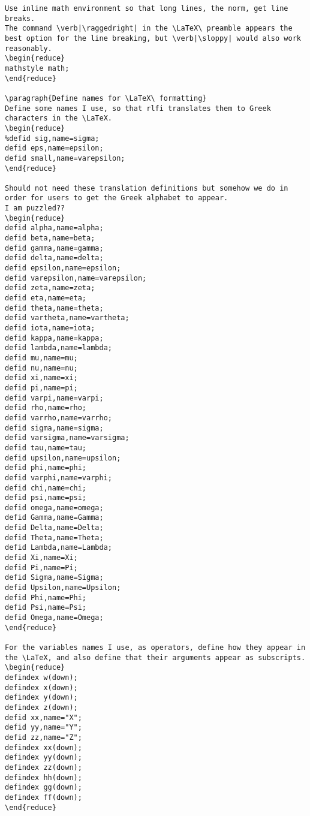 \documentclass[11pt,a5paper]{article}
\begin{document}
\begin{reduce}
\begin{verbatim}
Use inline math environment so that long lines, the norm, get line breaks.
The command \verb|\raggedright| in the \LaTeX\ preamble appears the best option for the line breaking, but \verb|\sloppy| would also work reasonably.
\begin{reduce}
mathstyle math;
\end{reduce}

\paragraph{Define names for \LaTeX\ formatting}
Define some names I use, so that rlfi translates them to Greek characters in the \LaTeX.
\begin{reduce}
%defid sig,name=sigma;
defid eps,name=epsilon;
defid small,name=varepsilon;
\end{reduce}

Should not need these translation definitions but somehow we do in order for users to get the Greek alphabet to appear.
I am puzzled??
\begin{reduce}
defid alpha,name=alpha;
defid beta,name=beta;
defid gamma,name=gamma;
defid delta,name=delta;
defid epsilon,name=epsilon;
defid varepsilon,name=varepsilon;
defid zeta,name=zeta;
defid eta,name=eta;
defid theta,name=theta;
defid vartheta,name=vartheta;
defid iota,name=iota;
defid kappa,name=kappa;
defid lambda,name=lambda;
defid mu,name=mu;
defid nu,name=nu;
defid xi,name=xi;
defid pi,name=pi;
defid varpi,name=varpi;
defid rho,name=rho;
defid varrho,name=varrho;
defid sigma,name=sigma;
defid varsigma,name=varsigma;
defid tau,name=tau;
defid upsilon,name=upsilon;
defid phi,name=phi;
defid varphi,name=varphi;
defid chi,name=chi;
defid psi,name=psi;
defid omega,name=omega;
defid Gamma,name=Gamma;
defid Delta,name=Delta;
defid Theta,name=Theta;
defid Lambda,name=Lambda;
defid Xi,name=Xi;
defid Pi,name=Pi;
defid Sigma,name=Sigma;
defid Upsilon,name=Upsilon;
defid Phi,name=Phi;
defid Psi,name=Psi;
defid Omega,name=Omega;
\end{reduce}

For the variables names I use, as operators, define how they appear in the \LaTeX, and also define that their arguments appear as subscripts.
\begin{reduce}
defindex w(down);
defindex x(down);
defindex y(down);
defindex z(down);
defid xx,name="X";
defid yy,name="Y";
defid zz,name="Z";
defindex xx(down);
defindex yy(down);
defindex zz(down);
defindex hh(down);
defindex gg(down);
defindex ff(down);
\end{reduce}


\end{verbatim}
\end{reduce}
\end{document}
